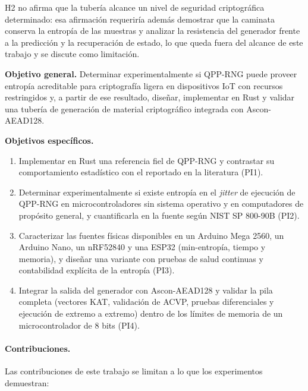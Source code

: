 H2 no afirma que la tubería alcance un nivel de seguridad criptográfica determinado: esa afirmación requeriría además demostrar que la caminata conserva la entropía de las muestras y analizar la resistencia del generador frente a la predicción y la recuperación de estado, lo que queda fuera del alcance de este trabajo y se discute como limitación.

\textbf{Objetivo general.} Determinar experimentalmente si QPP-RNG puede proveer entropía acreditable para criptografía ligera en dispositivos IoT con recursos restringidos y, a partir de ese resultado, diseñar, implementar en Rust y validar una tubería de generación de material criptográfico integrada con Ascon-AEAD128.

\textbf{Objetivos específicos.}
\begin{enumerate}
    \item Implementar en Rust una referencia fiel de QPP-RNG y contrastar su comportamiento estadístico con el reportado en la literatura (PI1).
    \item Determinar experimentalmente si existe entropía en el \textit{jitter} de ejecución de QPP-RNG en microcontroladores sin sistema operativo y en computadores de propósito general, y cuantificarla en la fuente según NIST SP 800-90B (PI2).
    \item Caracterizar las fuentes físicas disponibles en un Arduino Mega 2560, un Arduino Nano, un nRF52840 y una ESP32 (min-entropía, tiempo y memoria), y diseñar una variante con pruebas de salud continuas y contabilidad explícita de la entropía (PI3).
    \item Integrar la salida del generador con Ascon-AEAD128 y validar la pila completa (vectores KAT, validación de ACVP, pruebas diferenciales y ejecución de extremo a extremo) dentro de los límites de memoria de un microcontrolador de 8 bits (PI4).
\end{enumerate}

\paragraph{Contribuciones.} Las contribuciones de este trabajo se limitan a lo que los experimentos demuestran:

